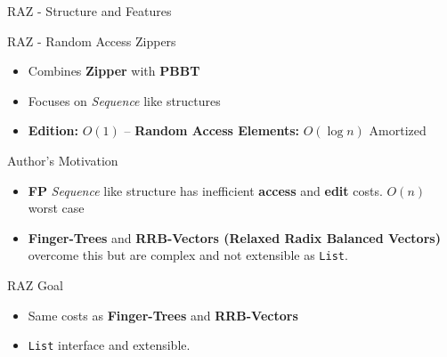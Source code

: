\documentclass{beamer}
\begin{document}
\begin{frame}[fragile]{RAZ - Structure and Features}

  \begin{block}{RAZ - Random Access Zippers}
    \begin{itemize}
      \item Combines \textbf{Zipper} with \textbf{PBBT}
      \item Focuses on \textit{Sequence} like structures
      \item \textbf{Edition:} $O(1)$ -- \textbf{Random Access Elements:} $O(\log{n})$ Amortized
    \end{itemize}
  \end{block}

   \begin{block}{Author's Motivation}
    \begin{itemize}
      \item \textbf{FP} \textit{Sequence} like structure has inefficient \textbf{access} and \textbf{edit} costs. $O(n)$ worst case
      \item \textbf{Finger-Trees} and \textbf{RRB-Vectors (Relaxed Radix Balanced Vectors)} overcome this but are complex and not extensible as \texttt{List}.
    \end{itemize}
  \end{block}

   \begin{block}{RAZ Goal}
    \begin{itemize}
      \item Same costs as \textbf{Finger-Trees} and \textbf{RRB-Vectors}
      \item \texttt{List} interface and extensible.
    \end{itemize}
  \end{block}

\end{frame}
\end{document}
